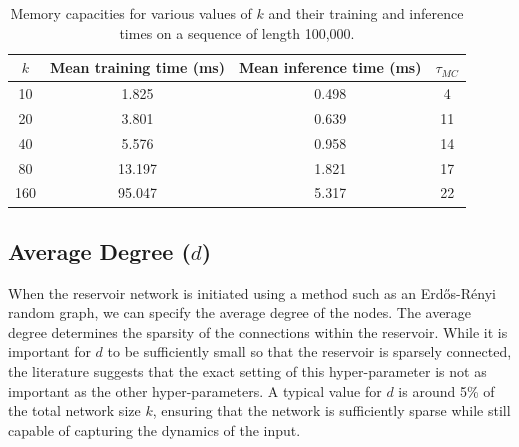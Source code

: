 \documentclass[a4paper,12pt]{article}
\begin{document}
\begin{table}[h]
\centering
 \begin{tabular}{c c c c} 
 \hline
 $k$ & Mean training time (ms) & Mean inference time (ms) & $\tau_{MC}$\\%
 \hline
 10 & 1.825 & 0.498 & 4 \\ 
 20 & 3.801 & 0.639 & 11 \\
 40 & 5.576 & 0.958 & 14 \\
 80 & 13.197 & 1.821 & 17 \\
 160 & 95.047 & 5.317 & 22 \\
 \end{tabular}
 \caption{Memory capacities for various values of $k$ and their training and inference times on a sequence of length 100,000.}
\label{tab:ks}
\end{table}

\subsection*{Average Degree ($d$)}

When the reservoir network is initiated using a method such as an Erd\H os-R\'enyi random graph, we can specify the average degree of the nodes. The average degree determines the sparsity of the connections within the reservoir. While it is important for $d$ to be sufficiently small so that the reservoir is sparsely connected, the literature suggests that the exact setting of this hyper-parameter is not as important as the other hyper-parameters. A typical value for $d$ is around 5\% of the total network size $k$, ensuring that the network is sufficiently sparse while still capable of capturing the dynamics of the input.
\end{document}

